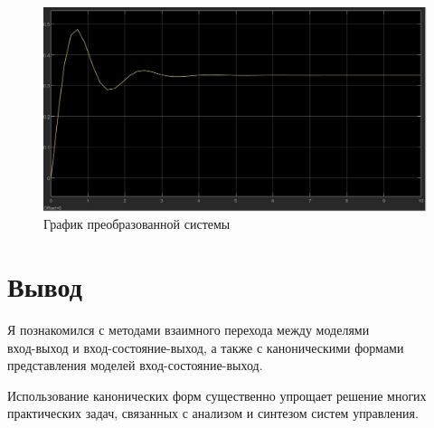 \documentclass[a4paper, 12pt]{article}
\begin{document}
    \begin{figure}[H]
        \centering
        \includegraphics[scale=0.3]{new_model_3.jpg}
        \captionsetup{skip=0pt}
        \caption{График преобразованной системы}
        \label{fig:nm3}
    \end{figure}


    \section{Вывод}
    Я познакомился с методами взаимного перехода между моделями \\
    вход-выход и вход-состояние-выход, а также с каноническими формами представления
    моделей вход-состояние-выход.
    
    
    Использование канонических форм существенно упрощает решение многих практических задач,
    связанных с анализом и синтезом систем управления.
\end{document}
